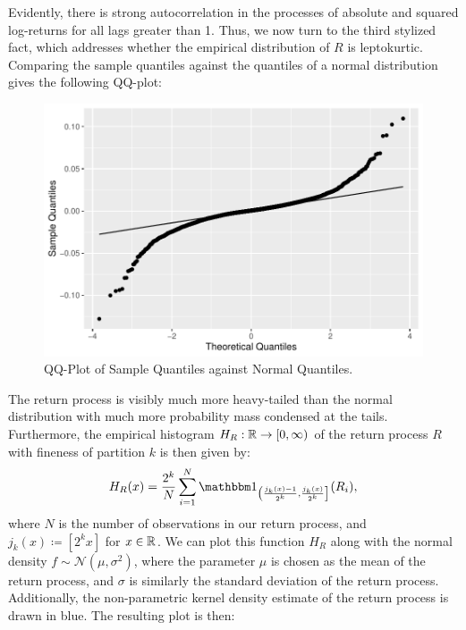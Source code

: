 Evidently, there is strong autocorrelation in the processes of absolute and squared log-returns for all lags greater than 1. Thus, we now turn to the third stylized fact, which addresses whether the empirical distribution of $R$ is leptokurtic. Comparing the sample quantiles against the quantiles of a normal distribution gives the following QQ-plot:\vspace{-6 pt}
\begin{figure}[H]
    \centering
    \includegraphics[scale=0.7]{fig/img/qqplot.pdf}
    \caption{QQ-Plot of Sample Quantiles against Normal Quantiles.}
    \label{fig:qqplot1}
\end{figure}
The return process is visibly much more heavy-tailed than the normal distribution with much more probability mass condensed at the tails. Furthermore, the empirical histogram $H_{R}:\mathbb{R}\to [0,\infty)$ of the return process $R$ with fineness of partition $k$ is then given by:
\begin{equation}
    H_{R}(x)=\frac{2^{k}}{N}\sum_{i=1}^{N}\ind_{\left(\frac{j_{k}(x)-1}{2^{k}},\frac{j_{k}(x)}{2^{k}}\right]}(R_{i}),
\end{equation}
where $N$ is the number of observations in our return process, and $j_{k}(x)\coloneqq [2^{k}x]$ for $x\in \mathbb{R}$. We can plot this function $H_{R}$ along with the normal density $f\sim \mathcal{N}(\mu,\sigma^{2})$, where the parameter $\mu$ is chosen as the mean of the return process, and $\sigma$ is similarly the standard deviation of the return process. Additionally, the non-parametric kernel density estimate of the return process is drawn in blue. The resulting plot is then:
